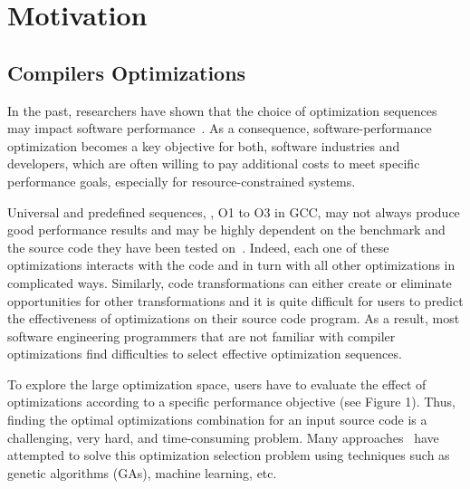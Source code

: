 \section{Motivation}
\subsection{Compilers Optimizations}
In the past, researchers have shown that the choice of optimization sequences may impact software performance~\cite{almagor2004finding,chen2012deconstructing}. 
As a consequence, software-performance optimization becomes a key objective for both, software industries and developers, which are often willing to pay additional costs to meet specific performance goals, especially for resource-constrained systems.

Universal and predefined sequences, \eg, O1 to O3 in GCC, may not always produce good performance results and may be highly dependent on the benchmark and the source code they have been tested on~\cite{almagor2004finding,hoste2008cole}.
Indeed, each one of these optimizations interacts with the code and in turn with all other optimizations in complicated ways. Similarly, code transformations can either create or eliminate opportunities for other transformations and it is quite difficult for users to predict the effectiveness of optimizations on their source code program.
As a result, most software engineering programmers that are not familiar with compiler optimizations find difficulties to select effective optimization sequences.

To explore the large optimization space, users have to evaluate the effect of optimizations according to a specific performance objective (see Figure 1). 
Thus, finding the optimal optimizations combination for an input source code is a challenging, very hard, and time-consuming problem. 
Many approaches~\cite{hoste2008cole,zhong2009tuning,sandran2012genetic,martins2014exploration} have attempted to solve this optimization selection problem using techniques such as genetic algorithms (GAs), machine learning, etc.

